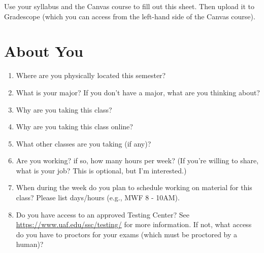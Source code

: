 \documentclass[12pt,fleqn]{article}
\begin{document}
\newcommand{\blank}[1]{\rule{#1}{0.75pt}}
\renewcommand{\d}{\displaystyle}
\begin{center}
  \large {}
\end{center}
Use your syllabus and the Canvas course to fill out this sheet. Then upload it to Gradescope (which you can access from the left-hand side of the Canvas course).

\section{About You}
\begin{enumerate}
\item Where are you physically located this semester?
\vfill
\item What is your major? If you don't have a major, what are you thinking about?
\vfill
\item Why are you taking this class?
\vfill
\item Why are you taking this class online?
\vfill
\item What other classes are you taking (if any)?
\vfill
\item Are you working? if so, how many hours per week? (If you're willing to share, what is your job? This is optional, but I'm interested.)
\vfill
\item When during the week do you plan to schedule working on material for this class? Please list days/hours (e.g., MWF 8 - 10AM).
\vfill
\item Do you have access to an approved Testing Center? See \url{https://www.uaf.edu/ssc/testing/} for more information. If not, what access do you have to proctors for your exams (which must be proctored by a human)?
\vfill
\end{enumerate}

\newpage
\end{document}

